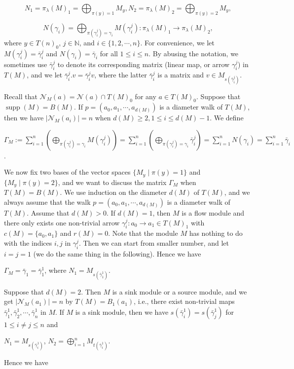 \documentclass[a4paper,12pt]{amsart}
\newcommand{\bg}{\bar{\gamma}}
\newcommand{\cN}{\mathcal{N}}
\DeclareMathOperator{\supp}{supp}
\begin{document}
\begin{equation*} 
N_1=\pi_\lambda(M)_1=\bigoplus _{\pi(y)=1}M_{y},  N_2=\pi_\lambda(M)_2=\bigoplus _{\pi(y)=2}M_{y},  
\end{equation*}


\begin{equation*} 
N(\gamma_i)=\bigoplus _{\pi(\gamma^j_i)=\gamma_i} M(\gamma^j_i):\pi_\lambda (M)_1\rightarrow \pi_\lambda (M)_2, 
\end{equation*}
where $y\in T(n)_0$,  $j\in \mathbb{N}$,   and $ i\in\{1,2,\cdots,n\}$. For convenience, we let $M(\gamma^j_i)=\bg^j_i$ and $N(\gamma_i)=\bg_i$ for all $1\leq i\leq n$.  By abusing the notation, we sometimes use $\bg^j_i$ to denote its  corresponding matrix (linear map, or arrow $\gamma^j_i$) in $T(M)$, and we let $\bg^j_i.v=\bg^j_i v$, where the latter $\bg^j_i$ is a matrix and $v\in M_{s(\bg^j_i)}$.




 Recall that  $\mathcal{N}_M(a)=\mathcal{N}(a) \cap T(M)_0$ for any $a\in T(M)_0$.    Suppose that $\supp(M)=B(M)$. If $p=(a_0,a_1,\cdots,a_{d(M)})$ is a diameter walk of $T(M)$, then we  have $\mid\cN_M(a_{i})\mid=n$ when $d(M)\geq 2, 1\leq i \leq d(M)-1$.
 We define
\begin{center}
 $ \Gamma_M:=\sum^n_{i=1}(\bigoplus _{\pi(\gamma^j_i)=\gamma_i} M(\gamma^j_i))=\sum^n_{i=1}(\bigoplus_{\pi(\gamma^j_i)=\gamma_i} \bg^j_i)=\sum^n_{i=1}N(\gamma_i)=\sum^n_{i=1}\bar{\gamma}_i$.   
\end{center} 

  We now fix two bases of the vector spaces $\{M_y\mid \pi(y)=1\}$ and $\{M_y\mid \pi(y)=2\}$, and we want to discuss the matrix $\Gamma_M$ when $T(M)=B(M)$.  We use induction on the diameter $d(M)$ of $T(M)$, and we always assume that the walk $p=(a_0,a_1,\cdots, a_{d(M)})$ is a diameter walk of $T(M)$. Assume that $d(M)>0$.  If $d(M)=1$, then  $M$ is a flow module and there only exists one non-trivial arrow $\gamma^j_i:a_0\rightarrow a_1\in T(M)_1$ with $c(M)=\{a_0,a_1\}$ and $r(M)=0$.  Note that the module $M$ has nothing to do with the indices $i,j$ in $\gamma^j_i$. Then we can  start from  smaller number, and let $i=j=1$ (we do the same thing in the following).  Hence we have 
\begin{center}
$\Gamma_M=\bg_1=\bg^1_1$, where $N_1=M_{s(\bg^1_1)}$.
\end{center}
Suppose that $d(M)=2$. Then $M$ is a sink module or a source module, and we get $\mid \cN_M(a_1)\mid =n$ by $T(M)=B_1(a_1)$, i.e.,   there exist non-trivial maps $\bg^1_1, \bg^1_2,\cdots, \bg^1_n$ in $M$. If  $M$ is a sink module,  then we have $s(\bg^1_i)=s(\bg^1_j)$ for $1\leq i\neq j\leq n$ and 
\begin{center}
 $N_1=M_{s(\bg^1_i)}$, $N_2=\bigoplus^n_{i=1} M_{t(\bg^1_i)}$.
\end{center}
Hence we have 
\end{document}
